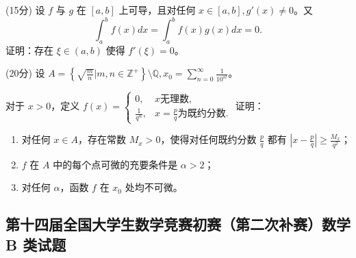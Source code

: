 \documentclass[loose]{ExBook}
\begin{document}
\begin{qitems}
    \begin{bbox}
        \qitem (15分) 设 \( f \) 与 \( g \) 在 \([a, b]\) 上可导，且对任何 \( x \in [a, b], g'(x) \neq 0 \)。又
        \[
        \int_a^b f(x) dx = \int_a^b f(x) g(x) dx = 0.
        \]
        证明：存在 \(\xi \in (a, b)\) 使得 \( f'(\xi) = 0 \)。
    \end{bbox}

    \begin{bbox}
        \qitem (20分) 设 \( A = \left\{ \sqrt{\frac{m}{n}} | m, n \in \mathbb{Z}^+ \right\} \setminus \mathbb{Q}, x_0 = \sum_{n=0}^{\infty} \frac{1}{10^{n!}} \)。
        
        对于 \( x > 0 \)，定义 \( f(x) = 
        \begin{cases}
        0, & x \text{无理数}, \\
        \frac{1}{q^\alpha}, & x = \frac{p}{q} \text{为既约分数}.
        \end{cases}\)
        证明：
        \begin{enumerate}[label=(\arabic*)]
            \item 对任何 \( x \in A \)，存在常数 \( M_x > 0 \)，使得对任何既约分数 \( \frac{p}{q} \) 都有 \( \left| x - \frac{p}{q} \right| \geq \frac{M_x}{q^2} \)；
            \item \( f \) 在 \( A \) 中的每个点可微的充要条件是 \( \alpha > 2 \)；
            \item 对任何 \( \alpha \)，函数 \( f \) 在 \( x_0 \) 处均不可微。
        \end{enumerate}
    \end{bbox}

\end{qitems}
\subsection{第十四届全国大学生数学竞赛初赛（第二次补赛）数学 B 类试题}
\end{document}
